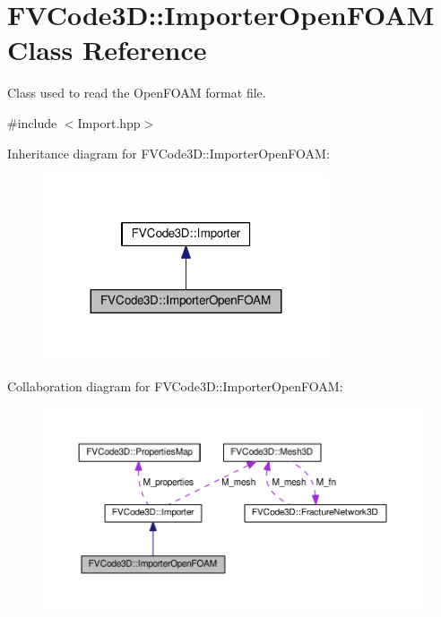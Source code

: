 \hypertarget{classFVCode3D_1_1ImporterOpenFOAM}{}\section{F\+V\+Code3D\+:\+:Importer\+Open\+F\+O\+AM Class Reference}
\label{classFVCode3D_1_1ImporterOpenFOAM}


Class used to read the Open\+F\+O\+AM format file.  




{\ttfamily \#include $<$Import.\+hpp$>$}



Inheritance diagram for F\+V\+Code3D\+:\+:Importer\+Open\+F\+O\+AM\+:
\nopagebreak
\begin{figure}[H]
\begin{center}
\leavevmode
\includegraphics[width=239pt]{classFVCode3D_1_1ImporterOpenFOAM__inherit__graph}
\end{center}
\end{figure}


Collaboration diagram for F\+V\+Code3D\+:\+:Importer\+Open\+F\+O\+AM\+:
\nopagebreak
\begin{figure}[H]
\begin{center}
\leavevmode
\includegraphics[width=350pt]{classFVCode3D_1_1ImporterOpenFOAM__coll__graph}
\end{center}
\end{figure}
